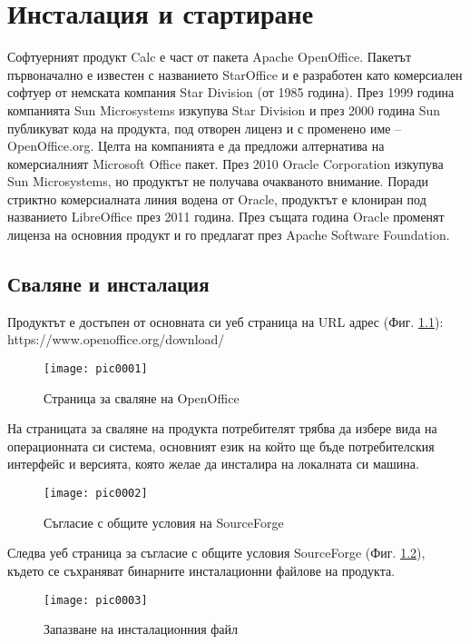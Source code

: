 ﻿\newpage
\chapter{Инсталация и стартиране}
\label{chapter01}

Софтуерният продукт Calc е част от пакета Apache OpenOffice. Пакетът първоначално е известен с названието StarOffice и е разработен като комерсиален софтуер от немската компания Star Division (от 1985 година). През 1999 година компанията Sun Microsystems изкупува Star Division и през 2000 година Sun публикуват кода на продукта, под отворен лиценз и с променено име – OpenOffice.org. Целта на компанията е да предложи алтернатива на комерсиалният Microsoft Office пакет. През 2010 Oracle Corporation изкупува Sun Microsystems, но продуктът не получава очакваното внимание. Поради стриктно комерсиалната линия водена от Oracle, продуктът е клониран под названието LibreOffice през 2011 година. През същата година Oracle променят лиценза на основния продукт и го предлагат през Apache Software Foundation. 

\section{Сваляне и инсталация}

Продуктът е достъпен от основната си уеб страница на URL адрес (Фиг. \ref{figure0001}): https://www.openoffice.org/download/

\begin{figure}[h!]
  \centering
  \texttt{[image: pic0001]}
  \caption{Страница за сваляне на OpenOffice}
\label{figure0001}
\end{figure}
\FloatBarrier

На страницата за сваляне на продукта потребителят трябва да избере вида на операционната си система, основният език на който ще бъде потребителския интерфейс и версията, която желае да инсталира на локалната си машина. 

\begin{figure}[h!]
  \centering
  \texttt{[image: pic0002]}
  \caption{Съгласие с общите условия на SourceForge}
\label{figure0002}
\end{figure}
\FloatBarrier

Следва уеб страница за съгласие с общите условия SourceForge (Фиг. \ref{figure0002}), където се съхраняват бинарните инсталационни файлове на продукта.

\begin{figure}[h!]
  \centering
  \texttt{[image: pic0003]}
  \caption{Запазване на инсталационния файл}
\label{figure0003}
\end{figure}
\FloatBarrier

